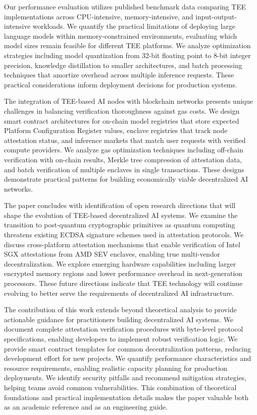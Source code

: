 Our performance evaluation utilizes published benchmark data comparing TEE implementations across CPU-intensive, memory-intensive, and input-output-intensive workloads. We quantify the practical limitations of deploying large language models within memory-constrained environments, evaluating which model sizes remain feasible for different TEE platforms. We analyze optimization strategies including model quantization from 32-bit floating point to 8-bit integer precision, knowledge distillation to smaller architectures, and batch processing techniques that amortize overhead across multiple inference requests. These practical considerations inform deployment decisions for production systems.

The integration of TEE-based AI nodes with blockchain networks presents unique challenges in balancing verification thoroughness against gas costs. We design smart contract architectures for on-chain model registries that store expected Platform Configuration Register values, enclave registries that track node attestation status, and inference markets that match user requests with verified compute providers. We analyze gas optimization techniques including off-chain verification with on-chain results, Merkle tree compression of attestation data, and batch verification of multiple enclaves in single transactions. These designs demonstrate practical patterns for building economically viable decentralized AI networks.

The paper concludes with identification of open research directions that will shape the evolution of TEE-based decentralized AI systems. We examine the transition to post-quantum cryptographic primitives as quantum computing threatens existing ECDSA signature schemes used in attestation protocols. We discuss cross-platform attestation mechanisms that enable verification of Intel SGX attestations from AMD SEV enclaves, enabling true multi-vendor decentralization. We explore emerging hardware capabilities including larger encrypted memory regions and lower performance overhead in next-generation processors. These future directions indicate that TEE technology will continue evolving to better serve the requirements of decentralized AI infrastructure.

The contribution of this work extends beyond theoretical analysis to provide actionable guidance for practitioners building decentralized AI systems. We document complete attestation verification procedures with byte-level protocol specifications, enabling developers to implement robust verification logic. We provide smart contract templates for common decentralization patterns, reducing development effort for new projects. We quantify performance characteristics and resource requirements, enabling realistic capacity planning for production deployments. We identify security pitfalls and recommend mitigation strategies, helping teams avoid common vulnerabilities. This combination of theoretical foundations and practical implementation details makes the paper valuable both as an academic reference and as an engineering guide.

